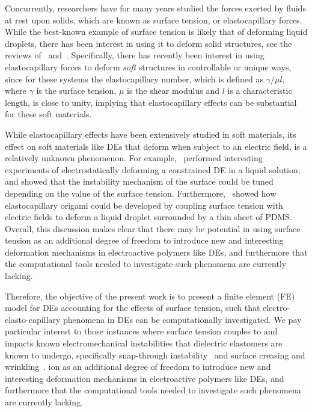 \documentclass[final,authoryear,3p,times]{elsarticle}
\begin{document}
Concurrently, researchers have for many years studied the forces exerted by fluids at rest upon solids, which are known as surface tension, or elastocapillary forces.  While the best-known example of surface tension is likely that of deforming liquid droplets, there has been interest in using it to deform solid structures, see the reviews of~\citet{romanJPCM2010} and~\citet{liuAMS2012}.  Specifically, there has recently been interest in using elastocapillary forces to deform \emph{soft} structures in controllable or unique ways, since for these systems the elastocapillary number, which is defined as $\gamma/\mu l$, where $\gamma$ is the surface tension, $\mu$ is the shear modulus and $l$ is a characteristic length, is close to unity, implying that elastocapillary effects can be substantial for these soft materials.  

While elastocapillary effects have been extensively studied in soft materials, its effect on soft materials like DEs that deform when subject to an electric field, is a relatively unknown phenomenon.  For example,~\citet{wangPRE2013} performed interesting experiments of electrostatically deforming a constrained DE in a liquid solution, and showed that the instability mechanism of the surface could be tuned depending on the value of the surface tension.  Furthermore,~\citet{pineiruaSM2010} showed how elastocapillary origami could be developed by coupling surface tension with electric fields to deform a liquid droplet surrounded by a thin sheet of PDMS.  Overall, this discussion makes clear that there may be potential in using surface tension as an additional degree of freedom to introduce new and interesting deformation mechanisms in electroactive polymers like DEs, and furthermore that the computational tools needed to investigate such phenomena are currently lacking.  

Therefore, the objective of the present work is to present a finite element (FE) model for DEs accounting for the effects of surface tension, such that electro-elasto-capillary phenomena in DEs can be computationally investigated.  We pay particular interest to those instances where surface tension couples to and impacts known electromechanical instabilities that dielectric elastomers are known to undergo, specifically snap-through instability~\citep{pelrineSCIENCE2000} and surface creasing and wrinkling~\citep{wangPRL2011,wangAM2012,wangPRE2013}.
ion as an additional degree of freedom to introduce new and interesting deformation mechanisms in electroactive polymers like DEs, and furthermore that the computational tools needed to investigate such phenomena are currently lacking.  
\end{document}
